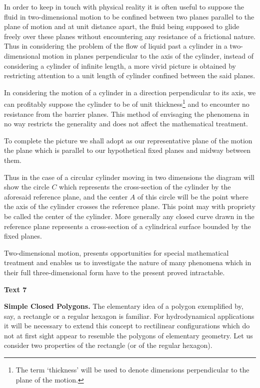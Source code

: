 \documentclass[a4paper]{article}
\newcommand{\ESect}[1]{\medskip\par{\large \textbf{#1}}\par}
\begin{document}
In order to keep in touch with physical reality it is often useful to suppose the fluid in two-dimensional motion to be
confined between two planes parallel to the plane of motion and at unit distance apart, the fluid being supposed to glide
freely over these planes without encountering any resistance of a frictional nature. Thus in considering the problem of the
flow of liquid past a cylinder in a two-dimensional motion in planes perpendicular to the axis of the cylinder, instead of
considering a cylinder of infinite length, a more vivid picture is obtained by restricting attention to a unit length of
cylinder confined between the said planes.

In considering the motion of a cylinder in a direction perpendicular to its axis, we can profitably suppose the cylinder to
be of unit thickness\footnote{The term `thickness' will be used to denote dimensions perpendicular to the plane of the motion.}
and to encounter no resistance from the barrier planes. This method of envisaging the phenomena in no way restricts the
generality and does not affect the mathematical treatment.

To complete the picture we shall adopt as our representative plane of the motion the plane which is parallel to our hypothetical
fixed planes and midway between them.

Thus in the case of a circular cylinder moving in two dimensions the diagram will show the circle $C$ which represents the
cross-section of the cylinder by the aforesaid reference plane, and the center $A$ of this circle will be the point where the
axis of the cylinder crosses the reference plane. This point may with propriety be called the center of the cylinder. More
generally any closed curve drawn in the reference plane represents a cross-section of a cylindrical surface bounded by the
fixed planes.

Two-dimensional motion, presents opportunities for special mathematical treatment and enables us to investigate the nature
of many phenomena which in their full three-dimensional form have to the present proved intractable.

\ESect{Text 7}
\textbf{Simple Closed Polygons.} The elementary idea of a polygon exemplified by, say, a rectangle or a regular hexagon
is familiar. For hydrodynamical applications it will be necessary to extend this concept to rectilinear configurations which
do not at first sight appear to resemble the polygons of elementary geometry. Let us consider two properties of the rectangle
(or of the regular hexagon).
\end{document}

